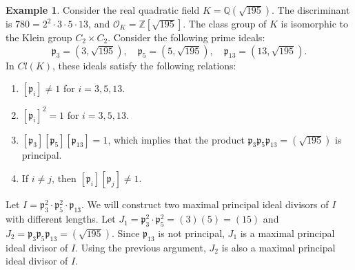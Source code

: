 \documentclass[11pt]{article}
\theoremstyle{definition}
\newtheorem{example}{Example}
\begin{document}
\begin{example}
    Consider the real quadratic field $K = \mathbb{Q}(\sqrt{195})$. The discriminant is $780 =2^2\cdot 3 \cdot 5 \cdot 13$, and $\mathcal{O}_K = \mathbb{Z}[\sqrt{195}]$. The class group of $K$ is isomorphic to the Klein group $C_2 \times C_2$.
Consider the following prime ideals:
\[
\mathfrak{p}_3 = (3, \sqrt{195}), \quad \mathfrak{p}_5 = (5, \sqrt{195}), \quad \mathfrak{p}_{13} = (13, \sqrt{195}).
\]
In $Cl(K)$, these ideals satisfy the following relations:
\begin{enumerate}
    \item $[\mathfrak{p}_i] \neq 1$ for $i=3,5,13$.
    \item $[\mathfrak{p}_i]^2 = 1$ for $i=3,5,13$.
    \item $[\mathfrak{p}_3][\mathfrak{p}_5][\mathfrak{p}_{13}] = 1$, which implies that the product $\mathfrak{p}_3 \mathfrak{p}_5 \mathfrak{p}_{13} = (\sqrt{195})$ is principal.
    \item If $i\neq j$, then $[\mathfrak{p}_i][\mathfrak{p}_j]\neq 1$.
\end{enumerate}

Let $I = \mathfrak{p}_3^2 \cdot \mathfrak{p}_5^2 \cdot \mathfrak{p}_{13}$.
We will construct two maximal principal ideal divisors of $I$ with different lengths. Let $J_1=\mathfrak{p}_3^2\cdot\mathfrak{p}_5^2=(3)(5)=(15)$ and $J_2=\mathfrak{p}_3\mathfrak{p}_5\mathfrak{p}_{13}=(\sqrt{195})$. Since $\mathfrak{p}_{13}$ is not principal, $J_1$ is a maximal principal ideal divisor of $I$. Using the previous argument, $J_2$ is also a maximal principal ideal divisor of $I$. 
\end{example}
\end{document}
